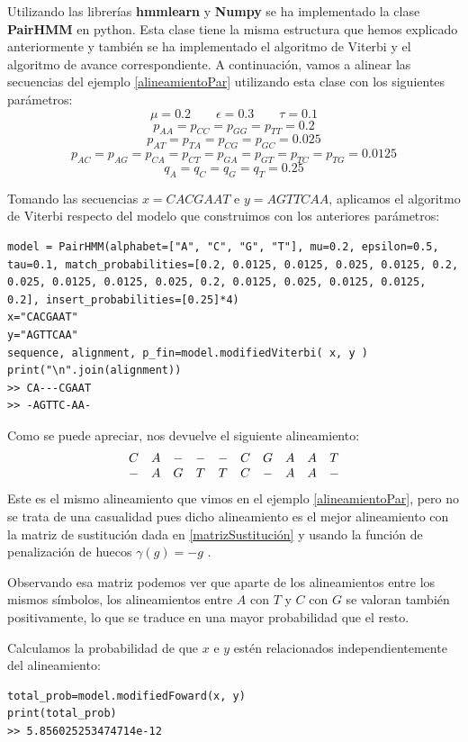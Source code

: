 \begin{exampleth}
Utilizando las librerías \textbf{hmmlearn} y \textbf{Numpy} se ha implementado la clase \textbf{PairHMM} en python. Esta clase tiene la misma estructura que hemos explicado anteriormente y también se ha implementado el algoritmo de Viterbi y el algoritmo de avance correspondiente. A continuación, vamos a alinear las secuencias del ejemplo \ref{alineamientoPar} utilizando esta clase con los siguientes parámetros:
\[\mu=0.2 \qquad \epsilon=0.3 \qquad \tau=0.1\]
\[p_{AA}=p_{CC}=p_{GG}=p_{TT}=0.2\]
\[p_{AT}=p_{TA}=p_{CG}=p_{GC}=0.025\]
\[p_{AC}=p_{AG}=p_{CA}=p_{CT}=p_{GA}=p_{GT}=p_{TC}=p_{TG}=0.0125\]
\[q_A=q_C=q_G=q_T=0.25\]

Tomando las secuencias $x=CACGAAT$ e $y=AGTTCAA$, aplicamos el algoritmo de Viterbi respecto del modelo que construimos con los anteriores parámetros:

\begin{verbatim}
model = PairHMM(alphabet=["A", "C", "G", "T"], mu=0.2, epsilon=0.5, tau=0.1, match_probabilities=[0.2, 0.0125, 0.0125, 0.025, 0.0125, 0.2, 0.025, 0.0125, 0.0125, 0.025, 0.2, 0.0125, 0.025, 0.0125, 0.0125, 0.2], insert_probabilities=[0.25]*4)
x="CACGAAT"
y="AGTTCAA"
sequence, alignment, p_fin=model.modifiedViterbi( x, y )
print("\n".join(alignment))
>> CA---CGAAT
>> -AGTTC-AA-
\end{verbatim}

Como se puede apreciar, nos devuelve el siguiente alineamiento:
    \[\begin{array}{c c c c c c c c c c}
        C & A & -& -& -& C& G& A& A& T \\
        -& A& G& T& T& C& -& A& A& -
    \end{array}\]
Este es el mismo alineamiento que vimos en el ejemplo \ref{alineamientoPar}, pero no se trata de una casualidad pues dicho alineamiento es el mejor alineamiento con la matriz de sustitución dada en \eqref{matrizSustitución} y usando la función de penalización de huecos $\gamma(g)=-g$ \cite{Vidyasagar}.

Observando esa matriz podemos ver que aparte de los alineamientos entre los mismos símbolos, los alineamientos entre $A$ con $T$ y $C$ con $G$ se valoran también positivamente, lo que se traduce en una mayor probabilidad que el resto. 

Calculamos la probabilidad de que $x$ e $y$ estén relacionados independientemente del alineamiento:
\begin{verbatim}
total_prob=model.modifiedFoward(x, y)
print(total_prob)
>> 5.856025253474714e-12
\end{verbatim}


\end{exampleth}

